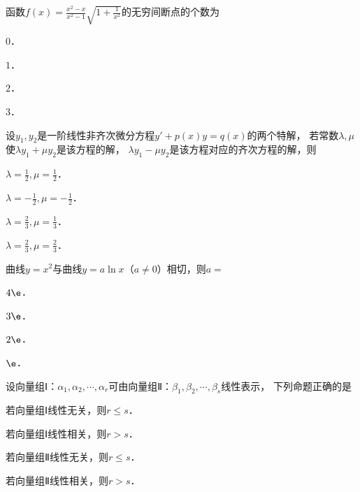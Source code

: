 \documentclass[plain,noanswer,medmath]{../../template/jnuexam}
\begin{document}






\begin{problem}
函数$f(x) = \frac{x^2 - x}{x^2 - 1}\sqrt{1 + \frac{1}{x^2}}$的无穷间断点的个数为\pickout{}
\begin{abcd}
\item $0$．
\item $1$．
\item $2$．
\item $3$．
\end{abcd}
\end{problem}


\begin{problem}
设$y_1,y_2$是一阶线性非齐次微分方程$y' + p(x)y = q(x)$的两个特解，
若常数$\lambda ,\mu$使$\lambda y_1 + \mu y_2$是该方程的解，
$\lambda y_1 - \mu y_2$是该方程对应的齐次方程的解，则\pickout{}
\begin{abcd}
\item $\lambda = \frac{1}{2},\mu = \frac{1}{2}$．
\item $\lambda = - \frac{1}{2},\mu = - \frac{1}{2}$．
\item $\lambda = \frac{2}{3},\mu = \frac{1}{3}$．
\item $\lambda = \frac{2}{3},\mu = \frac{2}{3}$．
\end{abcd}
\end{problem}


\begin{problem}
曲线$y = x^2$与曲线$y = a\ln x$（$a \ne 0$）相切，则$a =$\pickout{}
\begin{abcd}
\item $4\e$．
\item $3\e$．
\item $2\e$．
\item $\e$．
\end{abcd}
\end{problem}








\begin{problem}
设向量组Ⅰ：$\alpha_1,\alpha_2, \cdots ,\alpha_r$可由向量组Ⅱ：$\beta_1,\beta_2, \cdots ,\beta_s$线性表示，
下列命题正确的是\pickout{}
\begin{abcd}
\item 若向量组Ⅰ线性无关，则$r \le s$．
\item 若向量组Ⅰ线性相关，则$r > s$．
\item 若向量组Ⅱ线性无关，则$r \le s$．
\item 若向量组Ⅱ线性相关，则$r > s$．
\end{abcd}
\end{problem}
\end{document}
